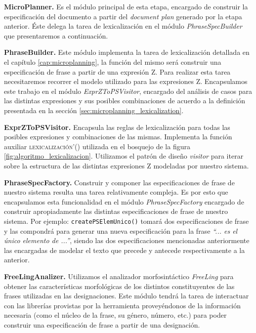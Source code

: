 \bigskip
\noindent
\textbf{MicroPlanner.} Es el módulo principal de esta etapa, encargado de construir la especificación del documento a partir del \textit{document plan} generado por la etapa anterior. Éste delega la tarea de lexicalización en el módulo \textit{PhraseSpecBuilder} que presentaremos a continuación.

\bigskip
\noindent
\textbf{PhraseBuilder.} Este módulo implementa la tarea de lexicalización detallada en el capítulo \ref{cap:microplanning}, la función del mismo será construir una especificación de frase a partir de una expresión Z. Para realizar esta tarea necesitaremos recorrer el modelo utilizado para las expresiones Z. Encapsulamos este trabajo en el módulo \textit{ExprZToPSVisitor}, encargado del análisis de casos para las distintas expresiones y sus posibles combinaciones de acuerdo a la definición presentada en la sección \ref{sec:microplanning_lexicalization}.

\bigskip
\noindent
\textbf{ExprZToPSVisitor.} Encapsula las reglas de lexicalización para todas las posibles expresiones y combinaciones de las mismas. Implementa la función auxiliar \textsc{lexicalización'()} utilizada en el bosquejo de la figura \ref{fig:algoritmo_lexicalizacion}. Utilizamos el patrón de diseño \textit{visitor} \cite{gof} para iterar sobre la estructura de las distintas expresiones Z modeladas por nuestro sistema.

\bigskip
\noindent
\textbf{PhraseSpecFactory.} Construir y componer las especificaciones de frase de nuestro sistema resulta una tarea relativamente compleja. Es por esto que encapsulamos esta funcionalidad en el módulo \textit{PhraseSpecFactory} encargado de construir apropiadamente las distintas especificaciones de frase de nuestro sistema. Por ejemplo: \texttt{createPSElemUnico()} tomará dos especificaciones de frase y las compondrá para generar una nueva especificación para la frase \textit{``... es el único elemento de ...''}, siendo las dos especificaciones mencionadas anteriormente las encargadas de modelar el texto que precede y antecede respectivamente a la anterior.

\bigskip
\noindent
\textbf{FreeLingAnalizer.} Utilizamos el analizador morfosintáctico \textit{FreeLing} para obtener las características morfológicas de los distintos constituyentes de las frases utilizadas en las designaciones. Este módulo tendrá la tarea de interactuar con las librerías provistas por la herramienta proveyéndonos de la información necesaria (como el núcleo de la frase, su género, número, etc.) para poder construir una especificación de frase a partir de una designación.

